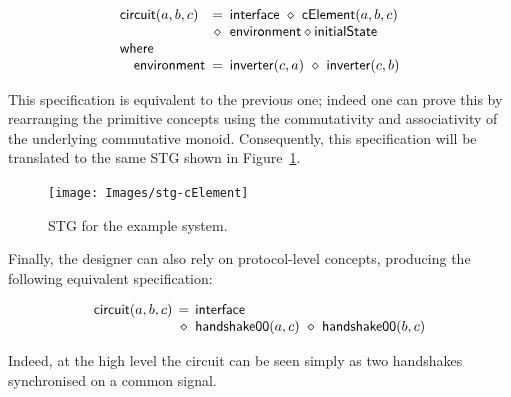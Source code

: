 \documentclass[british, journal]{IEEEtran}
\begin{document}
\vspace{-3mm}
\[
\begin{array}{lcl}
\mathsf{circuit}(a,b,c)&\hspace{-2mm}=&\hspace{-2mm}\mathsf{interface}~\diamond~\mathsf{cElement}(a,b,c)\\
~&\hspace{-2mm}\diamond&\hspace{-2mm}\mathsf{environment}\diamond\mathsf{initialState}\\
\mathsf{where}&~&~\\
\,\,\,\,\,\,\mathsf{environment}&\hspace{-2mm}=&\hspace{-2mm}\mathsf{inverter}(c,a)~\diamond~\mathsf{inverter}(c,b)
\end{array}
\]

\noindent This specification is equivalent to the previous one; indeed one can
prove this by rearranging the primitive concepts using the commutativity
and associativity of the underlying commutative monoid. Consequently,
this specification will be translated to the same STG shown in
Figure~\ref{fig:cElement STG composition}.

\begin{figure}[h]
\begin{centering}
\texttt{[image: Images/stg-cElement]}
\par\end{centering}
\protect\caption{\label{fig:cElement STG composition}STG for the example system.}
\vspace{-4mm}
\end{figure}

Finally, the designer can also rely on protocol-level concepts, producing
the following equivalent specification:

\vspace{-3mm}
\[
\begin{array}{lcl}
\mathsf{circuit}(a,b,c)&\hspace{-2mm}=&\hspace{-2mm}\mathsf{interface}\\
~&\hspace{-2mm}\diamond&\hspace{-2mm}\mathsf{handshake00}(a,c)~\diamond~\mathsf{handshake00}(b,c)\\
\end{array}
\]

\noindent Indeed, at the high level the circuit can be seen simply as two
handshakes synchronised on a common signal.
\end{document}
